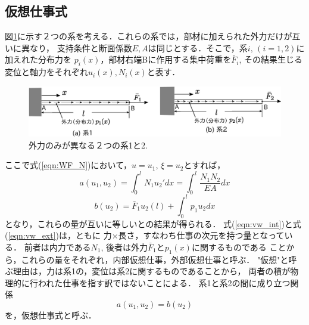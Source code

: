 \documentclass[10pt,a4j]{jarticle}
\begin{document}
\subsection{仮想仕事式}
図\ref{fig:fig1_2}に示す２つの系を考える．これらの系では，部材に加えられた外力だけが互いに異なり，
支持条件と断面係数$E,A$は同じとする．そこで，系$i,\, (i=1,2)$に加えれた分布力を
$p_i(x)$，部材右端Bに作用する集中荷重を$\bar F_i$, その結果生じる変位と軸力をそれぞれ$u_i(x), N_i(x)$と表す．
\begin{figure}[h]
	\begin{center}
	\includegraphics[width=0.8\linewidth]{fig1_2.eps} 
	\end{center}
	\caption{外力のみが異なる２つの系1と2.} 
	\label{fig:fig1_2}
\end{figure}
ここで式(\ref{eqn:WF_N})において，$u=u_1$, $\xi=u_2$とすれば，
\begin{equation}
	a(u_1,u_2)=\int_0^l N_1u_2'dx = \int_0^l\frac{N_1N_2}{EA}dx
	\label{eqn:vw_int}
\end{equation}
\begin{equation}
	b(u_2)=\bar F_1 u_2(l)+\int_0^l p_1 u_2dx
	\label{eqn:vw_ext}
\end{equation}
となり，これらの量が互いに等しいとの結果が得られる．
式(\ref{eqn:vw_int})と式(\ref{eqn:vw_ext})は，ともに
力$\times$長さ，すなわち仕事の次元を持つ量となっている．
前者は内力である$N_1$, 後者は外力$\bar F_1$と$p_1(x)$に関するものである
ことから，これらの量をそれぞれ，内部仮想仕事，外部仮想仕事と呼ぶ．
"仮想"と呼ぶ理由は，力は系1の，変位は系2に関するものであることから，
両者の積が物理的に行われた仕事を指す訳ではないことによる．
系1と系2の間に成り立つ関係
\begin{equation}
	a(u_1,u_2)=b(u_2)
	\label{eqn:vw_eq}
\end{equation}
を，仮想仕事式と呼ぶ．
\end{document}
